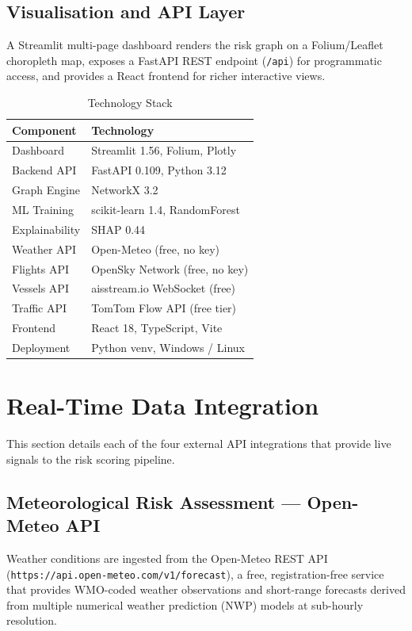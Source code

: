 \documentclass[conference]{IEEEtran}
\begin{document}
\subsection{Visualisation and API Layer}
A Streamlit multi-page dashboard renders the risk graph on a
Folium/Leaflet choropleth map, exposes a FastAPI REST endpoint
(\texttt{/api}) for programmatic access, and provides a React
frontend for richer interactive views.

\begin{table}[h!]
\centering
\caption{Technology Stack}
\label{tab:tech}
\begin{tabular}{ll}
\toprule
\textbf{Component} & \textbf{Technology} \\
\midrule
Dashboard & Streamlit 1.56, Folium, Plotly \\
Backend API & FastAPI 0.109, Python 3.12 \\
Graph Engine & NetworkX 3.2 \\
ML Training & scikit-learn 1.4, RandomForest \\
Explainability & SHAP 0.44 \\
Weather API & Open-Meteo (free, no key) \\
Flights API & OpenSky Network (free, no key) \\
Vessels API & aisstream.io WebSocket (free) \\
Traffic API & TomTom Flow API (free tier) \\
Frontend & React 18, TypeScript, Vite \\
Deployment & Python venv, Windows / Linux \\
\bottomrule
\end{tabular}
\end{table}


\section{Real-Time Data Integration}

This section details each of the four external API integrations
that provide live signals to the risk scoring pipeline.

\subsection{Meteorological Risk Assessment — Open-Meteo API}

Weather conditions are ingested from the Open-Meteo REST API
(\texttt{https://api.open-meteo.com/v1/forecast}), a free,
registration-free service that provides WMO-coded weather
observations and short-range forecasts derived from multiple
numerical weather prediction (NWP) models at sub-hourly resolution.
\end{document}
